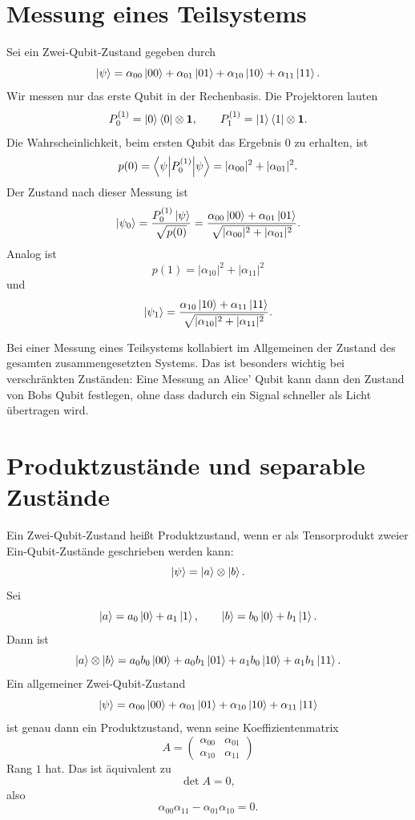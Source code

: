 \section{Messung eines Teilsystems}

Sei ein Zwei-Qubit-Zustand gegeben durch
\[
    \left|\psi\right\rangle
    =\alpha_{00}\left|00\right\rangle+\alpha_{01}\left|01\right\rangle
    +\alpha_{10}\left|10\right\rangle+\alpha_{11}\left|11\right\rangle.
\]
Wir messen nur das erste Qubit in der Rechenbasis. Die Projektoren lauten
\[
    P_0^{(1)}=\left|0\right\rangle\left\langle0\right|\otimes \mathbf{1},
    \qquad
    P_1^{(1)}=\left|1\right\rangle\left\langle1\right|\otimes \mathbf{1}.
\]
Die Wahrscheinlichkeit, beim ersten Qubit das Ergebnis \(0\) zu erhalten, ist
\[
    p(0)=\left\langle\psi\middle|P_0^{(1)}\middle|\psi\right\rangle
    =|\alpha_{00}|^2+|\alpha_{01}|^2.
\]
Der Zustand nach dieser Messung ist
\[
    \left|\psi_{0}\right\rangle
    =\frac{P_0^{(1)}\left|\psi\right\rangle}{\sqrt{p(0)}}
    =\frac{\alpha_{00}\left|00\right\rangle+\alpha_{01}\left|01\right\rangle}
    {\sqrt{|\alpha_{00}|^2+|\alpha_{01}|^2}}.
\]
Analog ist
\[
    p(1)=|\alpha_{10}|^2+|\alpha_{11}|^2
\]
und
\[
    \left|\psi_{1}\right\rangle
    =\frac{\alpha_{10}\left|10\right\rangle+\alpha_{11}\left|11\right\rangle}
    {\sqrt{|\alpha_{10}|^2+|\alpha_{11}|^2}}.
\]

\begin{warningbox}
Bei einer Messung eines Teilsystems kollabiert im Allgemeinen der Zustand des gesamten zusammengesetzten Systems. Das ist besonders wichtig bei verschränkten Zuständen: Eine Messung an Alice' Qubit kann dann den Zustand von Bobs Qubit festlegen, ohne dass dadurch ein Signal schneller als Licht übertragen wird.
\end{warningbox}

\section{Produktzustände und separable Zustände}

Ein Zwei-Qubit-Zustand heißt Produktzustand, wenn er als Tensorprodukt zweier Ein-Qubit-Zustände geschrieben werden kann:
\[
    \left|\psi\right\rangle=\left|a\right\rangle\otimes\left|b\right\rangle.
\]
Sei
\[
    \left|a\right\rangle=a_0\left|0\right\rangle+a_1\left|1\right\rangle,
    \qquad
    \left|b\right\rangle=b_0\left|0\right\rangle+b_1\left|1\right\rangle.
\]
Dann ist
\[
    \left|a\right\rangle\otimes\left|b\right\rangle
    =a_0b_0\left|00\right\rangle+a_0b_1\left|01\right\rangle
    +a_1b_0\left|10\right\rangle+a_1b_1\left|11\right\rangle.
\]
Ein allgemeiner Zwei-Qubit-Zustand
\[
    \left|\psi\right\rangle
    =\alpha_{00}\left|00\right\rangle+\alpha_{01}\left|01\right\rangle
    +\alpha_{10}\left|10\right\rangle+\alpha_{11}\left|11\right\rangle
\]
ist genau dann ein Produktzustand, wenn seine Koeffizientenmatrix
\[
    A=\begin{pmatrix}
        \alpha_{00}&\alpha_{01}\\
        \alpha_{10}&\alpha_{11}
    \end{pmatrix}
\]
Rang \(1\) hat. Das ist äquivalent zu
\[
    \det A=0,
\]
also
\[
    \alpha_{00}\alpha_{11}-\alpha_{01}\alpha_{10}=0.
\]

